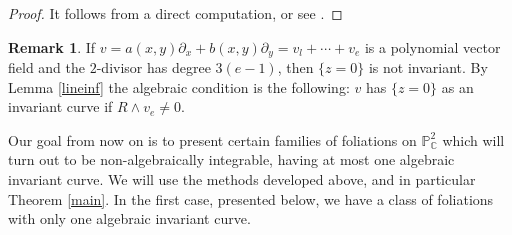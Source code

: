 \documentclass[reqno,oneside,11pt]{amsart}
\theoremstyle{definition}
\newtheorem{OBS}[thm]{Remark}
\begin{document}
\begin{proof} It follows from a direct computation, or see \cite[Lemma 2]{MR980960}.
\end{proof}

\begin{OBS}
    If $v = a(x,y)\partial_x+b(x,y)\partial_{y} = v_{l}+\cdots+v_{e}$ is a polynomial vector field and the $2$-divisor has degree $3(e-1)$, then $\{z=0\}$ is not invariant. By Lemma \ref{lineinf} the algebraic condition is the following: $v$ has $\{z=0\}$ as an invariant curve if $R\wedge v_{e} \neq 0$.
\end{OBS}

Our goal from now on is to present certain families of foliations on $\mathbb{P}^2_\mathbb{C}$ which will turn out to be non-algebraically integrable, having at most one algebraic invariant curve. We will use the methods developed above, and in particular Theorem \ref{main}. In the first case, presented below, we have a class of foliations with only one algebraic invariant curve.
\end{document}
